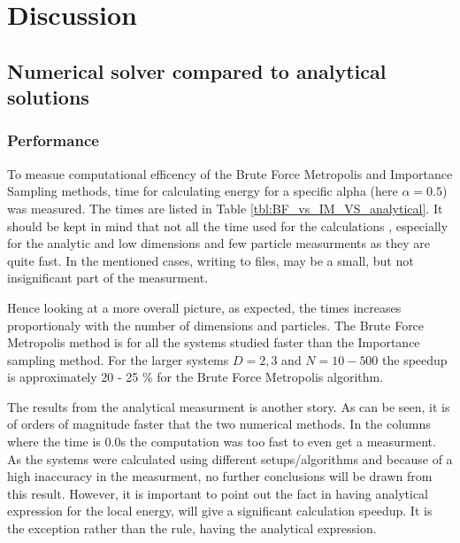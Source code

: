 \documentclass[
]{article}
\begin{document}
\hypertarget{discussion}{%
\section{Discussion}\label{discussion}}

\hypertarget{numerical-solver-compared-to-analytical-solutions}{%
\subsection*{Numerical solver compared to analytical
solutions}\label{numerical-solver-compared-to-analytical-solutions}}

\hypertarget{performance}{%
\subsubsection{Performance}\label{performance}}

To measue computational efficency of the Brute Force Metropolis and
Importance Sampling methods, time for calculating energy for a specific
alpha (here \(\alpha = 0.5\)) was measured. The times are listed in
Table \ref{tbl:BF_vs_IM_VS_analytical}. It should be kept in mind that
not all the time used for the calculations , especially for the analytic
and low dimensions and few particle measurments as they are quite fast.
In the mentioned cases, writing to files, may be a small, but not
insignificant part of the measurment.

Hence looking at a more overall picture, as expected, the times
increases proportionaly with the number of dimensions and particles. The
Brute Force Metropolis method is for all the systems studied faster than
the Importance sampling method. For the larger systems \(D = 2,3\) and
\(N = 10 - 500\) the speedup is approximately 20 - 25 \% for the Brute
Force Metropolis algorithm.

The results from the analytical measurment is another story. As can be
seen, it is of orders of magnitude faster that the two numerical
methods. In the columns where the time is \(0.0\)s the computation was
too fast to even get a measurment. As the systems were calculated using
different setups/algorithms and because of a high inaccuracy in the
measurment, no further conclusions will be drawn from this result.
However, it is important to point out the fact in having analytical
expression for the local energy, will give a significant calculation
speedup. It is the exception rather than the rule, having the analytical
expression.
\end{document}
